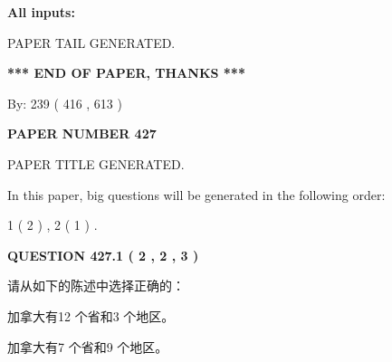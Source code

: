 \documentclass{ctexart}
\begin{document}
   
   
   
\noindent\vspace{0.1in}\hspace{-0.08in} {\textbf{\Large{All inputs: }}}
   
   
   
   
   
   
 \vspace{0.2in}
 
   
   
\vspace{2.0in} PAPER TAIL GENERATED.
   
   
   
   
\vspace{1.0in} 
{\textbf{\large{ *** END OF PAPER, THANKS *** }}} 
   
   
\hspace{1.0in} By: 
 239 ( 416 ,  613 )
   
   
   
   
\newpage 
\setcounter{page}{ 
   427001 } 
   
   
   
   
 {\textbf{ \Large{ PAPER NUMBER  427  }}}
   
   
\vspace{0.2in}
   
   
   
   
   
   
   
   
 \vspace{0.2in}
 
 
 
 
   
   
 PAPER TITLE GENERATED.
   
   
   
\vspace{0.2in}
   
In this paper, big questions will be generated in the following order: 
   
   
   1 ( 2 )
 ,
   2 ( 1 )
 .
  
\vspace{0.2in}
  
{\textbf{\Large{QUESTION
427.1 
 ( 2 , 2 , 3 )
}}}
  
  
请从如下的陈述中选择正确的：
 
 
加拿大有12 个省和3 个地区。
 
 
加拿大有7 个省和9 个地区。
 
\end{document}
